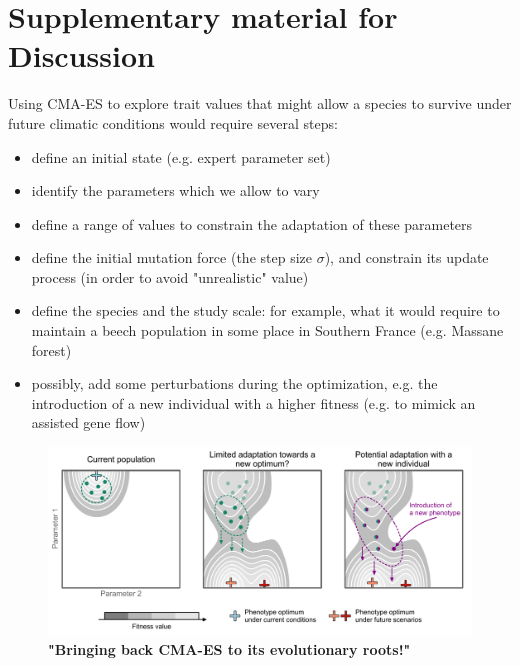 
\section{Supplementary material for Discussion}

\vspace*{1cm}

Using CMA-ES to explore trait values that might allow a species to survive under future climatic conditions would require several steps:
\begin{itemize}
\item define an initial state (e.g. expert parameter set)
\item identify the parameters which we allow to vary
\item define a range of values to constrain the adaptation of these parameters
\item define the initial mutation force (the step size $\sigma$), and constrain its update process (in order to avoid "unrealistic" value)
\item define the species and the study scale: for example, what it would require to maintain a beech population in some place in Southern France (e.g. Massane forest) 
\item possibly, add some perturbations during the optimization, e.g. the introduction of a new individual with a higher fitness (e.g. to mimick an assisted gene flow)
\end{itemize}

\begin{figure}[h]
\centering
\includegraphics{discussion/figs/cmaes_evolution.pdf}
\caption{\textbf{"Bringing back CMA-ES to its evolutionary roots!"}}
\label{fig:cmaesevolution}
\end{figure}